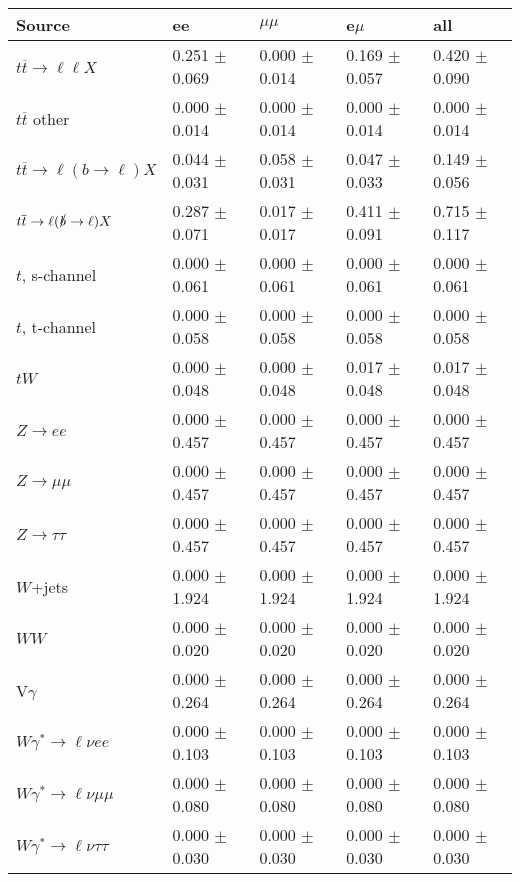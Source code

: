\begin{tabular}{l | l l l l}
\hline\hline
 Source  &  ee  &  $\mu\mu$  &  e$\mu$  &  all \\
\hline
$t\overline{t}\rightarrow \ell\ell X$ &  0.251 $\pm$  0.069 &  0.000 $\pm$  0.014 &  0.169 $\pm$  0.057 &  0.420 $\pm$  0.090\\
$t\overline{t}$ other &  0.000 $\pm$  0.014 &  0.000 $\pm$  0.014 &  0.000 $\pm$  0.014 &  0.000 $\pm$  0.014\\
$t\overline{t}\rightarrow \ell(b\rightarrow \ell)X$ &  0.044 $\pm$  0.031 &  0.058 $\pm$  0.031 &  0.047 $\pm$  0.033 &  0.149 $\pm$  0.056\\
$t\overline{t}\rightarrow \ell(\slashed{b}\rightarrow \ell)X$ &  0.287 $\pm$  0.071 &  0.017 $\pm$  0.017 &  0.411 $\pm$  0.091 &  0.715 $\pm$  0.117\\
\hline
$t$, s-channel &  0.000 $\pm$  0.061 &  0.000 $\pm$  0.061 &  0.000 $\pm$  0.061 &  0.000 $\pm$  0.061\\
$t$, t-channel &  0.000 $\pm$  0.058 &  0.000 $\pm$  0.058 &  0.000 $\pm$  0.058 &  0.000 $\pm$  0.058\\
$tW$ &  0.000 $\pm$  0.048 &  0.000 $\pm$  0.048 &  0.017 $\pm$  0.048 &  0.017 $\pm$  0.048\\
\hline
$Z\rightarrow ee$ &  0.000 $\pm$  0.457 &  0.000 $\pm$  0.457 &  0.000 $\pm$  0.457 &  0.000 $\pm$  0.457\\
$Z\rightarrow\mu\mu$ &  0.000 $\pm$  0.457 &  0.000 $\pm$  0.457 &  0.000 $\pm$  0.457 &  0.000 $\pm$  0.457\\
$Z\rightarrow\tau\tau$ &  0.000 $\pm$  0.457 &  0.000 $\pm$  0.457 &  0.000 $\pm$  0.457 &  0.000 $\pm$  0.457\\
$W$+jets &  0.000 $\pm$  1.924 &  0.000 $\pm$  1.924 &  0.000 $\pm$  1.924 &  0.000 $\pm$  1.924\\
$WW$ &  0.000 $\pm$  0.020 &  0.000 $\pm$  0.020 &  0.000 $\pm$  0.020 &  0.000 $\pm$  0.020\\
\hline
V$\gamma$ &  0.000 $\pm$  0.264 &  0.000 $\pm$  0.264 &  0.000 $\pm$  0.264 &  0.000 $\pm$  0.264\\
$W\gamma^{*}\rightarrow\ell\nu e e$ &  0.000 $\pm$  0.103 &  0.000 $\pm$  0.103 &  0.000 $\pm$  0.103 &  0.000 $\pm$  0.103\\
$W\gamma^{*}\rightarrow\ell\nu\mu\mu$ &  0.000 $\pm$  0.080 &  0.000 $\pm$  0.080 &  0.000 $\pm$  0.080 &  0.000 $\pm$  0.080\\
$W\gamma^{*}\rightarrow\ell\nu\tau\tau$ &  0.000 $\pm$  0.030 &  0.000 $\pm$  0.030 &  0.000 $\pm$  0.030 &  0.000 $\pm$  0.030\\

\end{tabular}
